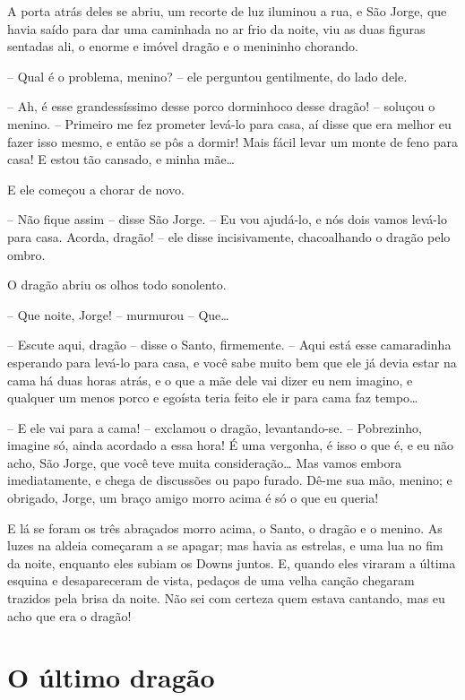 A porta atrás deles se abriu, um recorte de luz iluminou a rua, e São
Jorge, que havia saído para dar uma caminhada no ar frio da noite,
viu as duas figuras sentadas ali, o enorme e imóvel dragão e o
menininho chorando.

-- Qual é o problema, menino? -- ele perguntou gentilmente, do lado
dele.

-- Ah, é esse grandessíssimo desse porco dorminhoco desse dragão! --
soluçou o menino. -- Primeiro me fez prometer levá-lo para casa, aí
disse que era melhor eu fazer isso mesmo, e então se pôs a dormir!
Mais fácil levar um monte de feno para casa! E estou tão cansado, e
minha mãe…

E ele começou a chorar de novo.

-- Não fique assim -- disse São Jorge. -- Eu vou ajudá-lo, e nós dois
vamos levá-lo para casa. Acorda, dragão! -- ele disse incisivamente,
chacoalhando o dragão pelo ombro.

O dragão abriu os olhos todo sonolento.

-- Que noite, Jorge! -- murmurou -- Que…

-- Escute aqui, dragão -- disse o Santo, firmemente. -- Aqui está esse
camaradinha esperando para levá-lo para casa, e você sabe muito bem
que ele já devia estar na cama há duas horas atrás, e o que a mãe
dele vai dizer eu nem imagino, e qualquer um menos porco e egoísta
teria feito ele ir para cama faz tempo…

-- E ele vai para a cama! -- exclamou o dragão, levantando-se. --
Pobrezinho, imagine só, ainda acordado a essa hora! É uma vergonha, é
isso o que é, e eu não acho, São Jorge, que você teve muita
consideração… Mas vamos embora imediatamente, e chega de discussões
ou papo furado. Dê-me sua mão, menino; e obrigado, Jorge, um braço
amigo morro acima é só o que eu queria!

E lá se foram os três abraçados morro acima, o Santo, o dragão e o
menino. As luzes na aldeia começaram a se apagar; mas havia as
estrelas, e uma lua no fim da noite, enquanto eles subiam os Downs
juntos. E, quando eles viraram a última esquina e desapareceram de
vista, pedaços de uma velha canção chegaram trazidos pela brisa da
noite. Não sei com certeza quem estava cantando, mas eu acho que era
o dragão!

\chapter{O último dragão}

